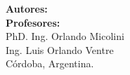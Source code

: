 \begin{center}
    \vspace{2.5cm}
    
    \begin{Large}
        \textbf{Autores:} \newauthor \\
        \vspace{1.0cm}
        \textbf{Profesores:} \\
        PhD. Ing. Orlando Micolini \\
        Ing. Luis Orlando Ventre \\
        \vspace{1cm}
        Córdoba, Argentina. \\
        \newdate
    \end{Large}
\end{center}
